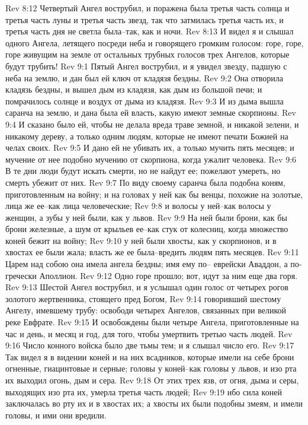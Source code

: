 Rev 8:12  Четвертый Ангел вострубил, и поражена была третья часть солнца и третья часть луны и третья часть звезд, так что затмилась третья часть их, и третья часть дня не светла была--так, как и ночи.
Rev 8:13  И видел я и слышал одного Ангела, летящего посреди неба и говорящего громким голосом: горе, горе, горе живущим на земле от остальных трубных голосов трех Ангелов, которые будут трубить!
Rev 9:1  Пятый Ангел вострубил, и я увидел звезду, падшую с неба на землю, и дан был ей ключ от кладязя бездны.
Rev 9:2  Она отворила кладязь бездны, и вышел дым из кладязя, как дым из большой печи; и помрачилось солнце и воздух от дыма из кладязя.
Rev 9:3  И из дыма вышла саранча на землю, и дана была ей власть, какую имеют земные скорпионы.
Rev 9:4  И сказано было ей, чтобы не делала вреда траве земной, и никакой зелени, и никакому дереву, а только одним людям, которые не имеют печати Божией на челах своих.
Rev 9:5  И дано ей не убивать их, а только мучить пять месяцев; и мучение от нее подобно мучению от скорпиона, когда ужалит человека.
Rev 9:6  В те дни люди будут искать смерти, но не найдут ее; пожелают умереть, но смерть убежит от них.
Rev 9:7  По виду своему саранча была подобна коням, приготовленным на войну; и на головах у ней как бы венцы, похожие на золотые, лица же ее--как лица человеческие;
Rev 9:8  и волосы у ней--как волосы у женщин, а зубы у ней были, как у львов.
Rev 9:9  На ней были брони, как бы брони железные, а шум от крыльев ее--как стук от колесниц, когда множество коней бежит на войну;
Rev 9:10  у ней были хвосты, как у скорпионов, и в хвостах ее были жала; власть же ее была--вредить людям пять месяцев.
Rev 9:11  Царем над собою она имела ангела бездны; имя ему по-- еврейски Аваддон, а по-гречески Аполлион.
Rev 9:12  Одно горе прошло; вот, идут за ним еще два горя.
Rev 9:13  Шестой Ангел вострубил, и я услышал один голос от четырех рогов золотого жертвенника, стоящего пред Богом,
Rev 9:14  говоривший шестому Ангелу, имевшему трубу: освободи четырех Ангелов, связанных при великой реке Евфрате.
Rev 9:15  И освобождены были четыре Ангела, приготовленные на час и день, и месяц и год, для того, чтобы умертвить третью часть людей.
Rev 9:16  Число конного войска было две тьмы тем; и я слышал число его.
Rev 9:17  Так видел я в видении коней и на них всадников, которые имели на себе брони огненные, гиацинтовые и серные; головы у коней--как головы у львов, и изо рта их выходил огонь, дым и сера.
Rev 9:18  От этих трех язв, от огня, дыма и серы, выходящих изо рта их, умерла третья часть людей;
Rev 9:19  ибо сила коней заключалась во рту их и в хвостах их; а хвосты их были подобны змеям, и имели головы, и ими они вредили.
